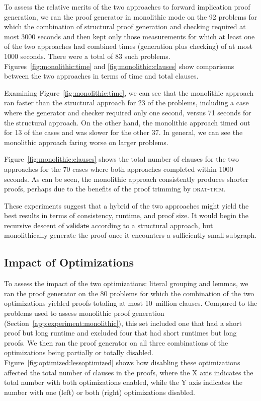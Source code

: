 \documentclass[letterpaper,USenglish,cleveref, autoref, thm-restate]{lipics-v2021}
\newcommand{\validate}{\textsf{validate}}
\newcommand{\progname}[1]{\textsc{#1}}
\newcommand{\dtrim}{\progname{drat-trim}}
\begin{document}





To assess the relative merits of the two approaches to forward
implication proof generation, we ran the proof generator in monolithic
mode on the 92 problems for which the combination of structural proof generation
and checking required at most 3000 seconds and then kept only those
measurements for which at least one of the two approaches had combined
times (generation plus checking) of at most 1000 seconds.  There were
a total of 83 such problems.  Figures~\ref{fig:monolithic:time} and
\ref{fig:monolithic:clauses} show comparisons between the two
approaches in terms of time and total clauses.

Examining Figure~\ref{fig:monolithic:time}, we can see that the
monolithic approach ran faster than the structural approach for 23 of
the problems, including a case where the generator and checker
required only one second, versus 71 seconds for the structural
approach.  On the other hand, the monolithic approach timed out for 13
of the cases and was slower for the other 37.  In general, we can see
the monolithic approach faring worse on larger problems.

Figure~\ref{fig:monolithic:clauses} shows the total number of clauses
for the two approaches for the 70 cases where both approaches completed within 1000 seconds.
As can be seen, the monolithic approach consistently produces
shorter proofs, perhaps due to the benefits of the proof trimming by
\dtrim{}.

These experiments suggest that a hybrid of the two approaches might
yield the best results in terms of consistency, runtime, and proof
size.  It would begin the recursive descent of $\validate$ according
to a structural approach, but monolithically generate
the proof once it encounters a sufficiently small subgraph.


\subsection{Impact of Optimizations}
\label{app:experiment:optimize}



To assess the impact of the two optimizations: literal grouping and
lemmas, we ran the proof generator on the 80 problems for which the
combination of the two optimizations yielded proofs totaling at most
10~million clauses.  Compared to the problems used to assess monolithic
proof generation (Section~\ref{app:experiment:monolithic}), this set included one that had a short proof but
long runtime and excluded four that had short runtimes but long
proofs.  We then ran the proof generator on all three combinations of
the optimizations being partially or totally disabled.
Figure~\ref{fig:optimized:lessoptimized} shows how disabling these optimizations affected the
total number of clauses in the proofs, where the X axis indicates the
total number with both optimizations enabled, while the Y axis
indicates the number with one (left) or both (right) optimizations
disabled.
\end{document}
